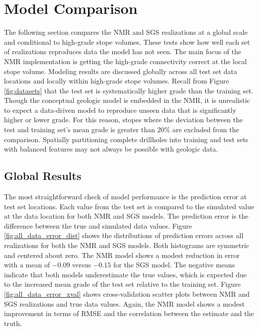 \FloatBarrier
\section{Model Comparison}
\label{sec:06compare}

The following section compares the \gls{NMR} and \gls{SGS} realizations at a global scale and conditional to high-grade stope volumes. These tests show how well each set of realizations reproduces data the model has not seen. The main focus of the \gls{NMR} implementation is getting the high-grade connectivity correct at the local stope volume. Modeling results are discussed globally across all test set data locations and locally within high-grade stope volumes. Recall from Figure \ref{fig:datasets} that the test set is systematically higher grade than the training set. Though the conceptual geologic model is embedded in the \gls{NMR}, it is unrealistic to expect a data-driven model to reproduce unseen data that is significantly higher or lower grade. For this reason, stopes where the deviation between the test and training set's mean grade is greater than $20\%$ are excluded from the comparison. Spatially partitioning complete drillholes into training and test sets with balanced features may not always be possible with geologic data.

\FloatBarrier
\subsection{Global Results}
\label{subsec:06global}

The most straightforward check of model performance is the prediction error at test set locations. Each value from the test set is compared to the simulated value at the data location for both \gls{NMR} and \gls{SGS} models. The prediction error is the difference between the true and simulated data values. Figure \ref{fig:all_data_error_dist} shows the distributions of prediction errors across all realizations for both the \gls{NMR} and \gls{SGS} models. Both histograms are symmetric and centered about zero. The \gls{NMR} model shows a modest reduction in error with a mean of $-0.09$ versus $-0.15$ for the \gls{SGS} model. The negative means indicate that both models underestimate the true values, which is expected due to the increased mean grade of the test set relative to the training set. Figure \ref{fig:all_data_error_xval} shows cross-validation scatter plots between \gls{NMR} and \gls{SGS} realizations and true data values. Again, the \gls{NMR} model shows a modest improvement in terms of \gls{RMSE} and the correlation between the estimate and the truth.

